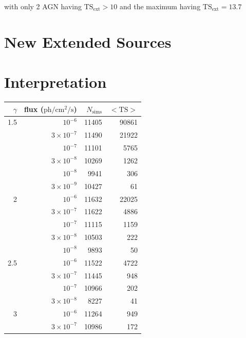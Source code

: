\documentclass[preprint]{aastex}
\newcommand{\s}{\text{s}\xspace}
\newcommand{\ph}{\text{ph}\xspace}
\newcommand{\cm}{\text{cm}\xspace}
\newcommand{\tsext}{\ensuremath{\text{TS}_\text{ext}}\xspace}
\newcommand{\ts}{\text{TS}\xspace}
\begin{document}
with only 2 AGN having $\tsext>10$ and the maximum having $\tsext=13.7$


\section{New Extended Sources}

\section{Interpretation}


\appendix

\begin{table}
  \begin{centering}
\begin{tabular}{ | r | r | r | r | }
\hline
$\gamma$ & flux ($\ph/\cm^2/\s$) & $N_\text{sims}$ & $<\ts>$ \\
\hline
  1.5 &          $10^{-6}$ &           11405 &  90861 \\
      &  $3\times 10^{-7}$ &           11490 &  21922 \\
      &          $10^{-7}$ &           11101 &   5765 \\
      &  $3\times 10^{-8}$ &           10269 &   1262 \\
      &          $10^{-8}$ &            9941 &    306 \\
      &  $3\times 10^{-9}$ &           10427 &     61 \\
\hline
    2 &          $10^{-6}$ &           11632 &  22025 \\
      &  $3\times 10^{-7}$ &           11622 &   4886 \\
      &          $10^{-7}$ &           11115 &   1159 \\
      &  $3\times 10^{-8}$ &           10503 &    222 \\
      &          $10^{-8}$ &            9893 &     50 \\
\hline
  2.5 &          $10^{-6}$ &           11522 &   4722 \\
      &  $3\times 10^{-7}$ &           11445 &    948 \\
      &          $10^{-7}$ &           10966 &    202 \\
      &  $3\times 10^{-8}$ &            8227 &     41 \\
\hline                                                
    3 &          $10^{-6}$ &           11264 &    949 \\
      &  $3\times 10^{-7}$ &           10986 &    172 \\

\end{tabular}
\end{centering}
\end{table}
\end{document}
